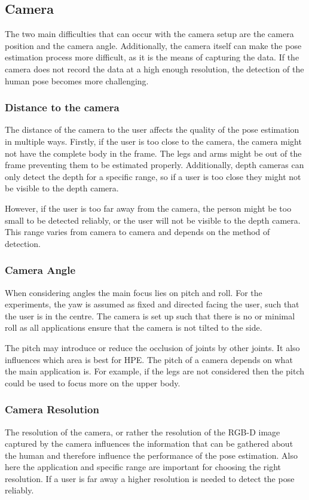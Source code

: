 \subsection{Camera}
\label{sec:camera}

The two main difficulties that can occur with the camera setup are the camera position and the camera angle. Additionally, the camera itself can make the pose estimation process more difficult, as it is the means of capturing the data. If the camera does not record the data at a high enough resolution, the detection of the human pose becomes more challenging.

\subsubsection{Distance to the camera}

The distance of the camera to the user affects the quality of the pose estimation in multiple ways. Firstly, if the user is too close to the camera, the camera might not have the complete body in the frame. The legs and arms might be out of the frame preventing them to be estimated properly. Additionally, depth cameras can only detect the depth for a specific range, so if a user is too close they might not be visible to the depth camera.

However, if the user is too far away from the camera, the person might be too small to be detected reliably, or the user will not be visible to the depth camera. This range varies from camera to camera and depends on the method of detection.

\subsubsection{Camera Angle}

When considering angles the main focus lies on pitch and roll. For the experiments, the yaw is assumed as fixed and directed facing the user, such that the user is in the centre. The camera is set up such that there is no or minimal roll as all applications ensure that the camera is not tilted to the side.

The pitch may introduce or reduce the occlusion of joints by other joints. It also influences which area is best for HPE. The pitch of a camera depends on what the main application is. For example, if the legs are not considered then the pitch could be used to focus more on the upper body.

\subsubsection{Camera Resolution}

The resolution of the camera, or rather the resolution of the RGB-D image captured by the camera influences the information that can be gathered about the human and therefore influence the performance of the pose estimation. Also here the application and specific range are important for choosing the right resolution. If a user is far away a higher resolution is needed to detect the pose reliably.
